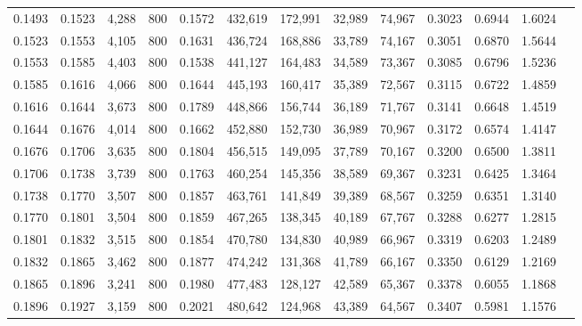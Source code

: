 \begin{tabular}{rrrrrrrrrrrrr}
0.1493 & 0.1523 &  4,288 &   800 &                                     0.1572 & 432,619 & 172,991 &  32,989 &  74,967 & 0.3023 & 0.6944 & 1.6024 \\
0.1523 & 0.1553 &  4,105 &   800 &                                     0.1631 & 436,724 & 168,886 &  33,789 &  74,167 & 0.3051 & 0.6870 & 1.5644 \\
0.1553 & 0.1585 &  4,403 &   800 &                                     0.1538 & 441,127 & 164,483 &  34,589 &  73,367 & 0.3085 & 0.6796 & 1.5236 \\
0.1585 & 0.1616 &  4,066 &   800 &                                     0.1644 & 445,193 & 160,417 &  35,389 &  72,567 & 0.3115 & 0.6722 & 1.4859 \\
0.1616 & 0.1644 &  3,673 &   800 &                                     0.1789 & 448,866 & 156,744 &  36,189 &  71,767 & 0.3141 & 0.6648 & 1.4519 \\
0.1644 & 0.1676 &  4,014 &   800 &                                     0.1662 & 452,880 & 152,730 &  36,989 &  70,967 & 0.3172 & 0.6574 & 1.4147 \\
0.1676 & 0.1706 &  3,635 &   800 &                                     0.1804 & 456,515 & 149,095 &  37,789 &  70,167 & 0.3200 & 0.6500 & 1.3811 \\
0.1706 & 0.1738 &  3,739 &   800 &                                     0.1763 & 460,254 & 145,356 &  38,589 &  69,367 & 0.3231 & 0.6425 & 1.3464 \\
0.1738 & 0.1770 &  3,507 &   800 &                                     0.1857 & 463,761 & 141,849 &  39,389 &  68,567 & 0.3259 & 0.6351 & 1.3140 \\
0.1770 & 0.1801 &  3,504 &   800 &                                     0.1859 & 467,265 & 138,345 &  40,189 &  67,767 & 0.3288 & 0.6277 & 1.2815 \\
0.1801 & 0.1832 &  3,515 &   800 &                                     0.1854 & 470,780 & 134,830 &  40,989 &  66,967 & 0.3319 & 0.6203 & 1.2489 \\
0.1832 & 0.1865 &  3,462 &   800 &                                     0.1877 & 474,242 & 131,368 &  41,789 &  66,167 & 0.3350 & 0.6129 & 1.2169 \\
0.1865 & 0.1896 &  3,241 &   800 &                                     0.1980 & 477,483 & 128,127 &  42,589 &  65,367 & 0.3378 & 0.6055 & 1.1868 \\
0.1896 & 0.1927 &  3,159 &   800 &                                     0.2021 & 480,642 & 124,968 &  43,389 &  64,567 & 0.3407 & 0.5981 & 1.1576 \\

\end{tabular}
